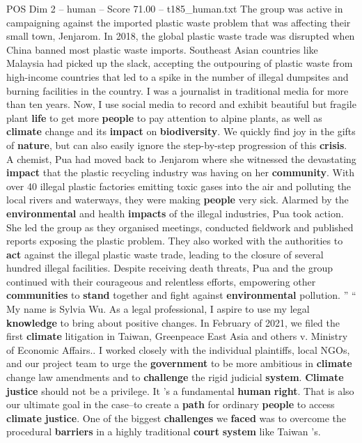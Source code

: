 \begin{textsample}{POS Dim 2 – human – Score 71.00 – t185\_human.txt}
The group was active in campaigning against the imported plastic waste problem that was affecting their small town, Jenjarom.
In 2018, the global plastic waste trade was disrupted when China banned most plastic waste imports.
Southeast Asian countries like Malaysia had picked up the slack, accepting the outpouring of plastic waste from high-income countries that led to a spike in the number of illegal dumpsites and burning facilities in the country.
I was a journalist in traditional media for more than ten years.
Now, I use social media to record and exhibit beautiful but fragile plant \textbf{life} to get more \textbf{people} to pay attention to alpine plants, as well as \textbf{climate} change and its \textbf{impact} on \textbf{biodiversity}.
We quickly find joy in the gifts of \textbf{nature}, but can also easily ignore the step-by-step progression of this \textbf{crisis}.
A chemist, Pua had moved back to Jenjarom where she witnessed the devastating \textbf{impact} that the plastic recycling industry was having on her \textbf{community}.
With over 40 illegal plastic factories emitting toxic gases into the air and polluting the local rivers and waterways, they were making \textbf{people} very sick.
Alarmed by the \textbf{environmental} and health \textbf{impacts} of the illegal industries, Pua took action.
She led the group as they organised meetings, conducted fieldwork and published reports exposing the plastic problem.
They also worked with the authorities to \textbf{act} against the illegal plastic waste trade, leading to the closure of several hundred illegal facilities.
Despite receiving death threats, Pua and the group continued with their courageous and relentless efforts, empowering other \textbf{communities} to \textbf{stand} together and fight against \textbf{environmental} pollution. ” “ My name is Sylvia Wu.
As a legal professional, I aspire to use my legal \textbf{knowledge} to bring about positive changes.
In February of 2021, we filed the first \textbf{climate} litigation in Taiwan, Greenpeace East Asia and others v.
Ministry of Economic Affairs..
I worked closely with the individual plaintiffs, local NGOs, and our project team to urge the \textbf{government} to be more ambitious in \textbf{climate} change law amendments and to \textbf{challenge} the rigid judicial \textbf{system}. \textbf{Climate} \textbf{justice} should not be a privilege.
It ’s a fundamental \textbf{human} \textbf{right}.
That is also our ultimate goal in the case–to create a \textbf{path} for ordinary \textbf{people} to access \textbf{climate} \textbf{justice}.
One of the biggest \textbf{challenges} we \textbf{faced} was to overcome the procedural \textbf{barriers} in a highly traditional \textbf{court} \textbf{system} like Taiwan ’s.

\end{textsample}

